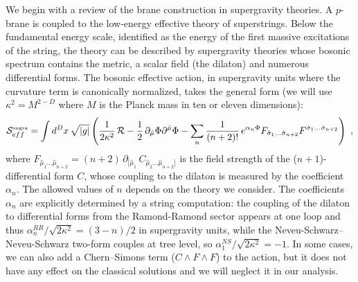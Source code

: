 \documentclass[a4paper,12pt]{article}
\def\action{{\cal S}}
\def\courbure{{\cal R}}
\def\hmu{{\hat \mu}}
\def\hsigma{{\hat \sigma}}
\begin{document}
We begin with a review of the brane construction in supergravity theories.
A $p$-brane is coupled to the low-energy effective theory of superstrings.
Below the fundamental energy scale, identified as the energy of the first massive
excitations of the string, the theory can be described by supergravity theories
whose bosonic spectrum contains the metric, a scalar field (the dilaton)
and numerous differential forms.
The bosonic effective action, in supergravity units where the curvature term
is canonically normalized, takes the general form
(we will use $\kappa^2=M^{2-D}$ where $M$ is the Planck mass in ten or eleven
dimensions):
%
\begin{equation}
	\label{eq:sugra}
\action_{eff}^{\mbox{\tiny sugra}} = \int d^Dx \, \sqrt{|g|}
\left(
\frac{1}{2\kappa^2}\, \courbure 
-\frac{1}{2}\, \partial_\hmu \Phi \partial^\hmu \Phi
- \sum_{n}
\frac{1}{(n+2)!}\, e^{\alpha_{n} \Phi}
F_{\hsigma_1\ldots \hsigma_{n+2}}  F^{\hsigma_1\ldots \hsigma_{n+2}}
\right)
\ ,
\end{equation}
%
where $ F_{\hmu_1\ldots\hmu_{n+2}} = (n+2) \,
	\partial_{[\hmu_1}\, C_{\hmu_2\ldots \hmu_{n+2}]} $ is the
field strength of the ($n+1$)-differential form $C$, whose coupling
to the dilaton is measured by the coefficient $\alpha_n$.
The allowed values of $n$ depends on the theory we consider.
The coefficients $\alpha_n$ are explicitly
determined by a string computation:
the coupling of the dilaton to differential forms
from the Ramond-Ramond sector
appears at one loop and thus
$\alpha_n^{RR}/\sqrt{2\kappa^2}=(3-n)/2$ in supergravity units,
while the Neveu-Schwarz--Neveu-Schwarz two-form couples at tree level, so
$\alpha_{1}^{NS}/\sqrt{2\kappa^2}=-1$.
In some cases, we can also add a Chern--Simons term
($C\wedge F \wedge F$) to the action, but
it does not have any effect on the classical solutions and we will
neglect it in our analysis.
\end{document}
